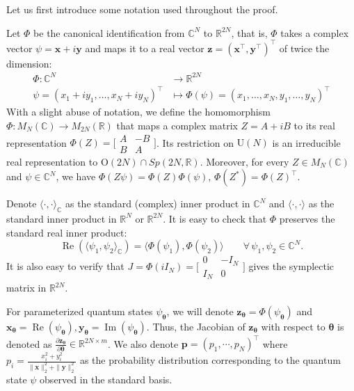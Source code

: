\documentclass{amsart}
\theoremstyle{plain}
\theoremstyle{definition}
\theoremstyle{remark}
\newcommand{\RR}{\mathbb{R}}
\newcommand{\CC}{\mathbb{C}}
\begin{document}
Let us first introduce some notation used throughout the proof.

Let $\Phi$ be the canonical identification from $\CC^N$ to $\RR^{2N}$, that is, $\Phi$ takes a complex vector $\psi=\mathbf{x}+i\mathbf{y}$ and maps it to a real vector $\mathbf{z}=(\mathbf{x}^\top,\mathbf{y}^\top)^\top$ of twice the dimension:
\begin{align*}
  \Phi\colon \mathbb{C}^N &\to \mathbb{R}^{2N} \\
  \psi = (x_1+iy_1, \dots, x_N+iy_N)^\top &\mapsto \Phi(\psi) = (x_1, \dots, x_N, y_1, \dots, y_N)^\top
\end{align*}
With a slight abuse of notation, we define the homomorphism $\Phi: M_N(\mathbb{C}) \to M_{2N}(\mathbb{R})$ that maps a complex matrix $Z = A + iB$ to its real representation $\Phi(Z) = \bigl[\begin{smallmatrix} A & -B \\ B & A \end{smallmatrix}\bigr]$. Its restriction on $\mathrm U(N)$ is an irreducible real representation to $\mathrm O(2N)\cap Sp(2N,\RR)$. Moreover, for every $Z\in M_N(\CC)$ and $\psi\in\CC^N$, we have $\Phi(Z\psi)=\Phi(Z)\Phi(\psi)$, $\Phi(Z^*)=\Phi(Z)^\top$.

Denote $\langle\cdot, \cdot\rangle_{\CC}$ as the standard (complex) inner product in $\CC^N$ and $\langle\cdot, \cdot\rangle$ as the standard inner product in $\RR^N$ or $\RR^{2N}$.
It is easy to check that $\Phi$ preserves the standard real inner product: 
\begin{equation*} 
\operatorname{Re}(\langle\psi_1,\psi_2\rangle_{\CC})=\langle\Phi(\psi_1),\Phi(\psi_2)\rangle \qquad \forall\,  \psi_1,\psi_2\in\CC^N. 
\end{equation*} 
It is also easy to verify that 
$J=\Phi(iI_N)=\bigl[\begin{smallmatrix}
    0&-I_N\\
    I_N&0
\end{smallmatrix}\bigr]  
$
gives the symplectic matrix in $\RR^{2N}$. 

For parameterized quantum states $\psi_{\bm\theta}$, we will denote $\mathbf{z}_{\bm\theta}=\Phi(\psi_{\bm\theta})$ and $\mathbf{x}_{\bm\theta}=\operatorname{Re} (\psi_{\bm\theta}),\mathbf{y}_{\bm\theta}=\operatorname{Im}(\psi_{\bm\theta})$. 
Thus, the Jacobian of $\mathbf{z}_{\bm\theta}$ with respect to $\bm\theta$ is denoted as $\frac{\partial \mathbf{z}_{\bm\theta}}{\partial\bm\theta}\in\RR^{2N\times m}$. 
We also denote $\bm{p}=(p_1,\cdots,p_N)^\top$ where $p_i=\frac{x_i^2+y_i^2}{\|\mathbf{x}\|_2^2+\|\mathbf{y}\|_2^2}$ as the probability distribution corresponding to the quantum state $\psi$ observed in the standard basis. 
\end{document}

